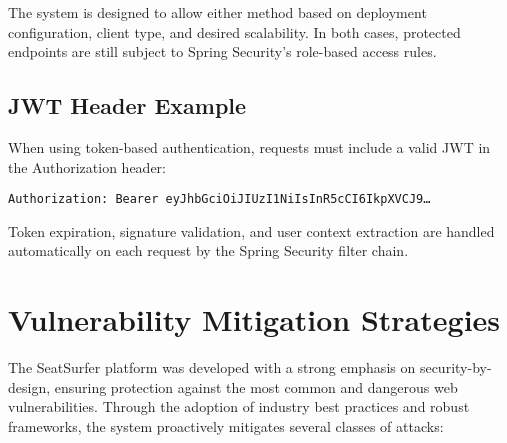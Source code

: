\documentclass[12pt,a4paper]{report}
\begin{document}
The system is designed to allow either method based on deployment configuration, client type, and desired scalability. In both cases, protected endpoints are still subject to Spring Security’s role-based access rules.

\subsection*{JWT Header Example}

When using token-based authentication, requests must include a valid JWT in the Authorization header:

\begin{verbatim}
Authorization: Bearer eyJhbGciOiJIUzI1NiIsInR5cCI6IkpXVCJ9…
\end{verbatim}

Token expiration, signature validation, and user context extraction are handled automatically on each request by the Spring Security filter chain.

\section{Vulnerability Mitigation Strategies}

The SeatSurfer platform was developed with a strong emphasis on security-by-design, ensuring protection against the most common and dangerous web vulnerabilities. Through the adoption of industry best practices and robust frameworks, the system proactively mitigates several classes of attacks:
\end{document}
